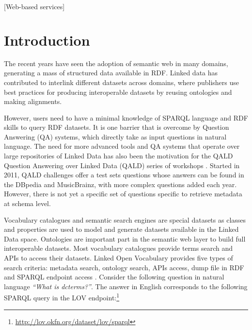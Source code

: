 \documentclass{acm}
\newcommand{\todo}[1]{\noindent\textcolor{red}{{\bf \{TODO}: #1{\bf \}}}}
\begin{document}
[Web-based services]





\section{Introduction}\label{sec:introduction}
The recent years have seen the adoption of semantic web in many domains, generating a mass of structured data available in RDF. Linked data has contributed to interlink different datasets across domains, where publishers use best practices for producing interoperable datasets by reusing ontologies and making alignments. 

However, users need to have a minimal knowledge of SPARQL language and RDF skills to query  RDF datasets. It is one barrier that is overcome by Question Answering (QA) systems, which directly take as input questions in natural language. The need for more advanced tools and QA systems that operate over large repositories of Linked Data has also been the motivation for the QALD Question Answering over Linked Data (QALD) series of workshops \cite{lopezetal2013}. Started in 2011, QALD challenges offer a test sets questions whose answers can be found in the DBpedia and MusicBrainz, with more complex questions added each year. However, there is not yet a specific set of questions specific to retrieve metadata at schema level.
 
Vocabulary catalogues and semantic search engines are special datasets as classes and properties are used to model and generate datasets available in the Linked Data space. Ontologies are important part in the semantic web layer to build full interoperable datasets. Most vocabulary catalogues provide terms search and APIs to access their datasets. Linked Open Vocabulary provides five types of search criteria: metadata search, ontology search, APIs access, dump file in RDF and SPARQL endpoint access \cite{vandenbusschelov}.
Consider the following question in natural language \textit{``What is dcterms?''}. The answer in English corresponds to the following SPARQL query in the LOV endpoint:\footnote{\url{http://lov.okfn.org/dataset/lov/sparql}}
\end{document}
